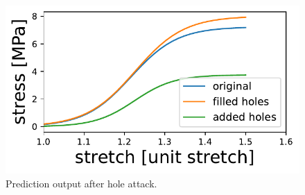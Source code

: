 \begin{figure}
    \centering
    \includegraphics{skinstression/images/attack/holes.pdf}
    \caption[Prediction output after hole attack]{
        Prediction output after hole attack.
    }
    \label{fig:pred_output_attack}
\end{figure}